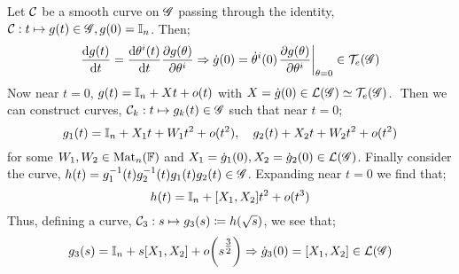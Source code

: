 \paraskip
Let $\mathcal{C}$ be a smooth curve on $\mathscr{G}$ passing through the identity, $\mathcal{C} : t \mapsto g(t) \in \mathscr{G}, g(0) = \mathbb{I}_n$. Then;
\begin{equation}
\frac{\ud g(t)}{\ud t} = \frac{\ud \theta^i (t)}{\ud t} \frac{\del g(\theta)}{\del \theta^i} \Rightarrow \dot{g}(0) = \dot{\theta}^i(0)\left.\frac{\del g(\theta)}{\del \theta^i}\right|_{\theta = 0} \in \TeG
\end{equation}
Now near $t = 0$, $g(t) = \mathbb{I}_n + X t + o(t)$ with $X = \dot{g}(0) \in \lie{\group} \simeq \TeG$.\footnotemark$\,\,$ Then we can construct curves, $\mathcal{C}_{k} : t \mapsto g_k(t) \in \mathscr{G}$ such that near $t = 0$;
\begin{equation}
g_1(t) = \mathbb{I}_n + X_1 t + W_1 t^2 + o(t^2), \quad g_2(t) + X_2 t + W_2 t^2 + o(t^2)
\end{equation}
for some $W_1, W_2 \in \text{Mat}_n(\mathbb{F})$ and $X_1 = \dot{g}_1(0), X_2 = \dot{g}_2(0) \in \lie{\group}$. Finally consider the curve, $h(t) = g_1^{-1}(t)g_2^{-1}(t)g_1(t)g_2(t) \in \mathscr{G}$. Expanding near $t = 0$ we find that;
\begin{equation}
h(t) = \mathbb{I}_n + [X_1, X_2] t^2 + o(t^3)
\end{equation}
Thus, defining a curve, $\mathcal{C}_3 : s \mapsto g_3(s) \coloneqq h(\sqrt{s})$, we see that;
\begin{equation}
g_3(s) = \II_n + s[X_1, X_2] + o\left(s^{\tfrac{3}{2}}\right) \Rightarrow \dot{g}_3(0) = [X_1, X_2] \in \lie{\group}
\end{equation}

